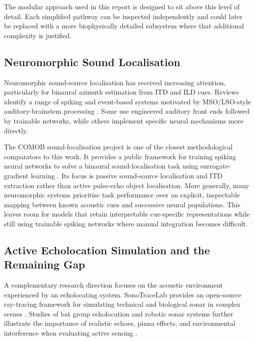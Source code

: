 The modular approach used in this report is designed to sit above this level of detail. Each simplified pathway can be inspected independently and could later be replaced with a more biophysically detailed subsystem where that additional complexity is justified.

\subsection{Neuromorphic Sound Localisation}

Neuromorphic sound-source localisation has received increasing attention, particularly for binaural azimuth estimation from ITD and ILD cues. Reviews identify a range of spiking and event-based systems motivated by MSO/LSO-style auditory-brainstem processing \cite{Danneville2024ASystems}. Some use engineered auditory front ends followed by trainable networks, while others implement specific neural mechanisms more directly.

The COMOB sound-localisation project is one of the closest methodological comparators to this work. It provides a public framework for training spiking neural networks to solve a binaural sound-localisation task using surrogate-gradient learning \cite{SpikingProject}. Its focus is passive sound-source localisation and ITD extraction rather than active pulse-echo object localisation. More generally, many neuromorphic systems prioritise task performance over an explicit, inspectable mapping between known acoustic cues and successive neural populations. This leaves room for models that retain interpretable cue-specific representations while still using trainable spiking networks where manual integration becomes difficult.

\subsection{Active Echolocation Simulation and the Remaining Gap}

A complementary research direction focuses on the acoustic environment experienced by an echolocating system. SonoTraceLab provides an open-source ray-tracing framework for simulating technical and biological sonar in complex scenes \cite{Jansen2024SonoTraceLabBats}. Studies of bat group echolocation and robotic sonar systems further illustrate the importance of realistic echoes, pinna effects, and environmental interference when evaluating active sensing \cite{Mazar2026Agent-basedEmergences,Schillebeeckx2011BiomimeticPinnae}.

